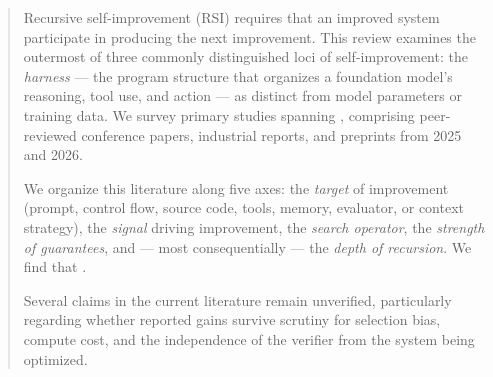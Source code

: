 %
%

\begin{abstract}
Recursive self-improvement (RSI) requires that an improved system participate
in producing the next improvement. This review examines the outermost of three
commonly distinguished loci of self-improvement: the \emph{harness} --- the
program structure that organizes a foundation model's reasoning, tool use, and
action --- as distinct from model parameters or training data. We survey
 primary studies spanning , comprising 
peer-reviewed conference papers,  industrial reports, and 
preprints from 2025 and 2026.

We organize this literature along five axes: the \emph{target} of improvement
(prompt, control flow, source code, tools, memory, evaluator, or context
strategy), the \emph{signal} driving improvement, the \emph{search operator},
the \emph{strength of guarantees}, and --- most consequentially --- the
\emph{depth of recursion}. We find that .

Several claims in the current literature remain unverified, particularly
regarding whether reported gains survive scrutiny for selection bias, compute
cost, and the independence of the verifier from the system being optimized.
\end{abstract}
